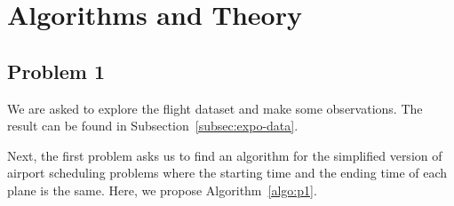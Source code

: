 \documentclass[11pt,a4paper]{article}
\begin{document}
%
%

\section{Algorithms and Theory}
\label{sec:algo}

\subsection{Problem 1}
\label{subsec:algo-prob1}
We are asked to explore the flight dataset and make some observations. The result can be found in Subsection~\ref{subsec:expo-data}. \par
Next, the first problem asks us to find an algorithm for the simplified version of airport scheduling problems where the starting time and the ending time of each plane is the same. Here, we propose Algorithm~\ref{algo:p1}. \par
\end{document}
